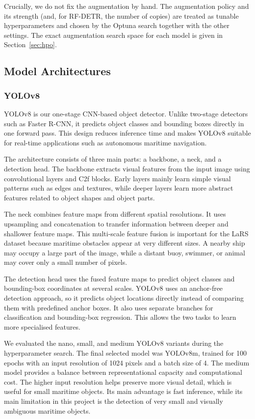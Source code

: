 \documentclass[11pt,a4paper]{article}
\begin{document}
Crucially, we do not fix the augmentation by hand. The augmentation policy and
its strength (and, for RF-DETR, the number of copies) are treated as tunable
hyperparameters and chosen by the Optuna search together with the other settings.
The exact augmentation search space for each model is given in
Section~\ref{sec:hpo}.

\subsection{Model Architectures}

\subsubsection{YOLOv8}
YOLOv8 is our one-stage CNN-based object detector. Unlike two-stage detectors
such as Faster R-CNN, it predicts object classes and bounding boxes directly in
one forward pass. This design reduces inference time and makes YOLOv8 suitable
for real-time applications such as autonomous maritime navigation.

The architecture consists of three main parts: a backbone, a neck, and a
detection head. The backbone extracts visual features from the input image using
convolutional layers and C2f blocks. Early layers mainly learn simple visual
patterns such as edges and textures, while deeper layers learn more abstract
features related to object shapes and object parts.

The neck combines feature maps from different spatial resolutions. It uses
upsampling and concatenation to transfer information between deeper and
shallower feature maps. This multi-scale feature fusion is important for the
LaRS dataset because maritime obstacles appear at very different sizes. A nearby
ship may occupy a large part of the image, while a distant buoy, swimmer, or
animal may cover only a small number of pixels.

The detection head uses the fused feature maps to predict object classes and
bounding-box coordinates at several scales. YOLOv8 uses an anchor-free detection
approach, so it predicts object locations directly instead of comparing them
with predefined anchor boxes. It also uses separate branches for classification
and bounding-box regression. This allows the two tasks to learn more specialised
features.

We evaluated the nano, small, and medium YOLOv8 variants during the
hyperparameter search. The final selected model was YOLOv8m, trained for
100 epochs with an input resolution of 1024 pixels and a batch size of 4.
The medium model provides a balance between representational capacity and
computational cost. The higher input resolution helps preserve more visual
detail, which is useful for small maritime objects. Its main advantage is fast
inference, while its main limitation in this project is the detection of very
small and visually ambiguous maritime objects.
\end{document}
